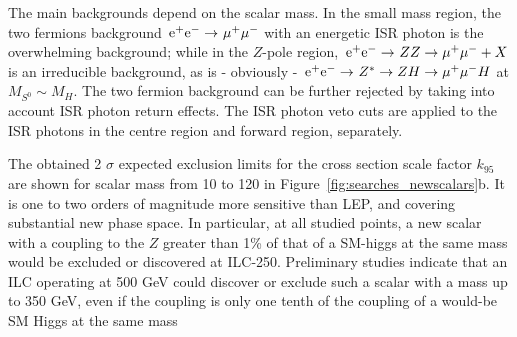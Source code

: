The main backgrounds depend on the scalar mass.
In
the small mass region, the two fermions background
$\mbox{$ {\, \mathrm e}^+ {\mathrm e}^- \to $}~\mu^+ \mu^-$ with an energetic ISR
photon is the overwhelming background;
while in the $Z$-pole region,
$\mbox{$ {\, \mathrm e}^+ {\mathrm e}^- \to $}~ZZ \rightarrow \mu^+ \mu^- + X$
is an irreducible background,
as is - obviously - $\mbox{$ {\, \mathrm e}^+ {\mathrm e}^- \to $}~Z^* \rightarrow ZH \rightarrow \mu^+\mu^- H$
at $M_{S^0} \sim M_H$.
The two fermion background can be
further rejected by taking into account ISR photon return effects.
The ISR photon veto cuts are applied to the ISR photons in the
centre region and forward region, separately.

The obtained 2 $\sigma$ expected exclusion limits for the
cross section scale factor
$k_{95}$ are shown for scalar mass from 10 \GeV to 120 \GeV
in  Figure~\ref{fig:searches_newscalars}b.
It is one to two orders of magnitude more sensitive than LEP, and
covering substantial new phase space.
In particular,
at all studied points, a new scalar with a coupling to the $Z$ greater
than 1\% of that of a SM-higgs at the same mass would be excluded or
discovered at ILC-250.
Preliminary studies indicate that an ILC operating at 500 GeV
could discover or exclude such a scalar with a mass up to 350 GeV,
even if the coupling is only one tenth of the coupling of a
would-be SM Higgs at the same mass \cite{yanlcws18}

